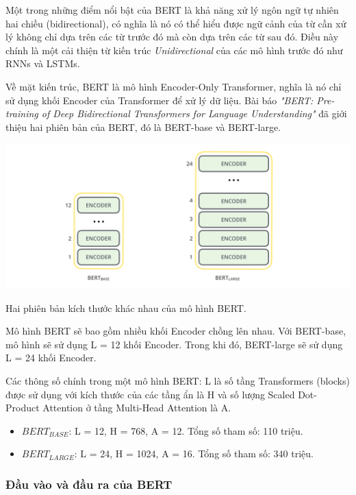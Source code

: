 \documentclass[a4paper, 12pt, openany]{book}
\begin{document}
Một trong những điểm nổi bật của BERT là khả năng xử lý ngôn ngữ tự nhiên hai
chiều (bidirectional), có nghĩa là nó có thể hiểu được ngữ cảnh của từ cần xử lý không chỉ
dựa trên các từ trước đó mà còn dựa trên các từ sau đó. Điều này chính là một cải thiện từ
kiến trúc \textit{Unidirectional} của các mô hình trước đó như RNNs và LSTMs.

Về mặt kiến trúc, BERT là mô hình Encoder-Only Transformer, nghĩa là nó chỉ sử dụng khối Encoder của Transformer để xử lý dữ liệu.
Bài báo \textit{"BERT: Pre-training of Deep Bidirectional Transformers for Language Understanding"} \cite{devlin2019bert} đã giới thiệu hai phiên bản của BERT, đó là BERT-base và BERT-large.

\begin{minipage}{\linewidth}
    \captionsetup{type=figure}
    \centering
    \includegraphics[width=\linewidth]{./assets/images/BERT-versions.png}
    \caption{Hai phiên bản kích thước khác nhau của mô hình BERT.}
\end{minipage}
\vspace{0.5cm}

Mô hình BERT sẽ bao gồm nhiều khối Encoder chồng lên nhau. Với BERT-base, mô hình sẽ sử dụng L = 12 khối Encoder. Trong khi đó, BERT-large sẽ sử dụng L = 24 khối Encoder.

Các thông số chính trong một mô hình BERT: L là số tầng Transformers (blocks)
được sử dụng với kích thước của các tầng ẩn là H và số lượng Scaled Dot-Product Attention
ở tầng Multi-Head Attention là A.

\begin{itemize}
    \item \(BERT_{BASE}\): L = 12, H = 768, A = 12. Tổng số tham số: 110 triệu.
    \item \(BERT_{LARGE}\): L = 24, H = 1024, A = 16. Tổng số tham số: 340 triệu.
\end{itemize}

\subsubsection{Đầu vào và đầu ra của BERT}
\end{document}

